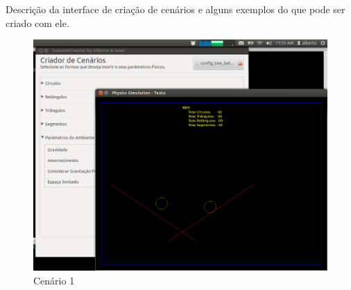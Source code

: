 Descrição da interface de criação de cenários e alguns exemplos do que pode ser criado com ele.


\begin{figure}
	\centering
	\caption{Cenário 1}
	\includegraphics[scale=0.3]{images/cenario-two-balls.png}
	\hspace{0.5cm}
\end{figure}

